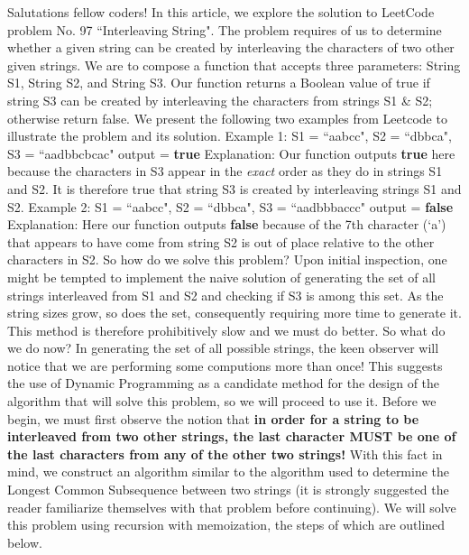 \documentclass{article}
\begin{document}
Salutations fellow coders!
\newline
\newline
In this article, we explore the solution to LeetCode problem No. 97 ``Interleaving String". The problem requires of us to determine whether a given string can be created by interleaving the characters of two other given strings. We are to compose a function that accepts three parameters: String S1, String S2, and String S3. Our function returns a Boolean value of true if string S3 can be created by interleaving the characters from strings S1 \& S2; otherwise return false. We present the following two examples from Leetcode to illustrate the problem and its solution. 
\newline 
\newline
Example 1:
\newline
\newline
S1 = ``aabcc", S2 = ``dbbca", S3 = ``aadbbcbcac"
output = \textbf{true} 
\newline
\newline
Explanation: Our function outputs \textbf{true} here because the characters in S3 appear in the \emph{exact} order as they do in strings S1 and S2. It is therefore true that string S3 is created by interleaving strings S1 and S2.
\newline
\newline
Example 2:
\newline
\newline
S1 = ``aabcc", S2 = ``dbbca", S3 = ``aadbbbaccc"
output = \textbf{false}
\newline
\newline
Explanation: Here our function outputs \textbf{false} because of the 7th character (`a') that appears to have come from string S2 is out of place relative to the other characters in S2.
\newline
\newline
So how do we solve this problem? Upon initial inspection, one might be tempted to implement the naive solution of generating the set of all strings interleaved from S1 and S2 and checking if S3 is among this set. As the string sizes grow, so does the set, consequently requiring more time to generate it. This method is therefore prohibitively slow and we must do better. So what do we do now? In generating the set of all possible strings, the keen observer will notice that we are performing some computions more than once! This suggests the use of Dynamic Programming as a candidate method for the design of the algorithm that will solve this problem, so we will proceed to use it. Before we begin, we must first observe the notion that \textbf{in order for a string to be interleaved from two other strings, the last character MUST be one of the last characters from any of the other two strings!} With this fact in mind, we construct an algorithm similar to the algorithm used to determine the Longest Common Subsequence between two strings (it is strongly suggested the reader familiarize themselves with that problem before continuing). We will solve this problem using recursion with memoization, the steps of which are outlined below.
\end{document}
